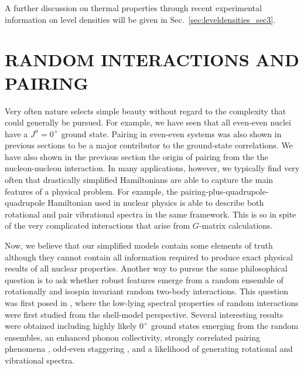 \documentclass[preprint,rmp,aps,floatfix]{revtex4}
\begin{document}
A further discussion on thermal properties through recent experimental
information on level densities will be given in 
Sec.~\ref{sec:leveldensities_sec3}. 



%
\section{RANDOM INTERACTIONS AND PAIRING}

\label{sec:randoms}

Very often nature selects simple beauty without 
regard to the complexity that could generally be 
pursued. For example, we have seen that all even-even
nuclei have a $J^{\pi}=0^+$ ground state. Pairing in
even-even systems was also shown in previous sections 
to be a major contributor to the ground-state correlations. 
We have also 
shown in the previous section the origin of pairing from the 
the nucleon-nucleon interaction. In many applications, however, 
we typically find very often that drastically simplified 
Hamiltonians are able to capture the main features of a physical
problem. For example, the pairing-plus-quadrupole-quadrupole Hamiltonian
used in nuclear physics is able to describe both rotational 
and pair vibrational spectra in the same framework. This is so
in spite of the very complicated interactions that 
arise from $G$-matrix calculations. 

Now, we believe that our simplified models contain some elements of
truth although they cannot contain all information required to produce
exact physical results of all nuclear properties. Another way 
to pursue the same philosophical question is to 
ask whether robust features emerge from 
a random ensemble of rotationally and isospin invariant random two-body
interactions. This question was first posed in 
\cite{jbd98}, where the low-lying spectral properties
of random interactions were first studied from the shell-model
perspective. Several interesting results were obtained including
highly likely $0^+$ ground states emerging from the random ensembles,
an enhanced phonon collectivity, strongly correlated pairing 
phenomena \cite{jbdt00}, odd-even staggering \cite{papen02},
and a likelihood of generating rotational and vibrational spectra. 
\end{document}
